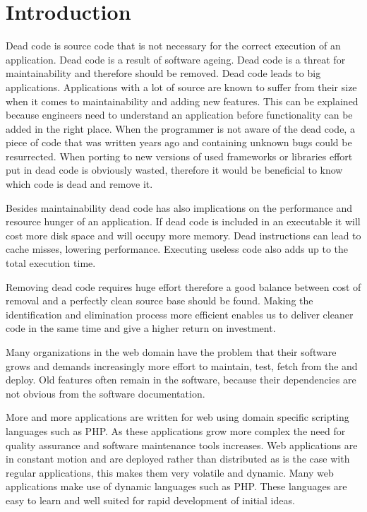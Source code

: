 \chapter{Introduction}
\label{ch:introduction}


Dead code is source code that is not necessary for the correct execution of an application. Dead code is a result of software ageing\cite{parnas1994,godfrey2000}. Dead code is a threat for maintainability and therefore should be removed. Dead code leads to big applications. Applications with a lot of source are known to suffer from their size when it comes to maintainability and adding new features\cite{godfrey2000,huang2003,kiewkanya2005}. This can be explained because engineers need to understand an application before functionality can be added in the right place. When the programmer is not aware of the dead code, a piece of code that was written years ago and containing unknown bugs could be resurrected. When porting to new versions of used frameworks or libraries effort put in dead code is obviously wasted, therefore it would be beneficial to know which code is dead and remove it.

Besides maintainability dead code has also implications on the performance and resource hunger of an application. If dead code is included in an executable it will cost more disk space and will occupy more memory. Dead instructions can lead to cache misses, lowering performance. Executing useless code also adds up to the total execution time.

Removing dead code requires huge effort\cite{andreopoulos2004,jones2006} therefore a good balance between cost of removal and a perfectly clean source base should be found\cite{scanniello2011}. Making the identification and elimination process more efficient enables us to deliver cleaner code in the same time and give a higher return on investment.

Many organizations in the web domain have the problem that their software grows and demands increasingly more effort to maintain, test, fetch from the \vcs and deploy. Old features often remain in the software, because their dependencies are not obvious from the software documentation.

More and more applications are written for web using domain specific scripting languages such as PHP. As these applications grow more complex the need for quality assurance and software maintenance tools increases. Web applications are in constant motion and are deployed rather than distributed as is the case with regular applications, this makes them very volatile and dynamic. Many web applications make use of dynamic languages such as PHP. These languages are easy to learn and well suited for rapid development of initial ideas. 

